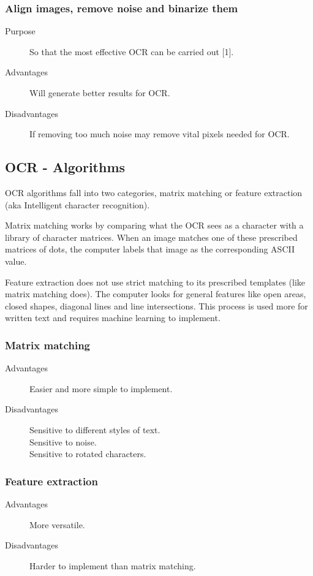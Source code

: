 \documentclass[a4paper,12pt]{article}
\begin{document}
\subsubsection{Align images, remove noise and binarize them}
\begin{description}
\item[Purpose] So that the most effective OCR can be carried out [1].
\item[Advantages] Will generate better results for OCR.
\item[Disadvantages] If removing too much noise may remove vital pixels needed for OCR.
\end{description}

\subsection{OCR - Algorithms}
OCR algorithms fall into two categories, matrix matching or feature extraction (aka Intelligent character recognition).

Matrix matching works by comparing what the OCR sees as a character with a library of character matrices. When an image matches one of these prescribed matrices of dots, the computer labels that image as the corresponding ASCII value.

Feature extraction does not use strict matching to its prescribed templates (like matrix matching does). The computer looks for general features like open areas, closed shapes, diagonal lines and line intersections. This process is used more for written text and requires machine learning to implement.

\subsubsection{Matrix matching}
\begin{description}
\item[Advantages] Easier and more simple to implement.
\item[Disadvantages] Sensitive to different styles of text.\cite{vocr_grad}
\\ Sensitive to noise.\cite{vocr_grad}
\\ Sensitive to rotated characters.\cite{vocr_grad}
\end{description}

\subsubsection{Feature extraction}
\begin{description}
\item[Advantages] More versatile.
\item[Disadvantages] Harder to implement than matrix matching.
\end{description}
\end{document}
